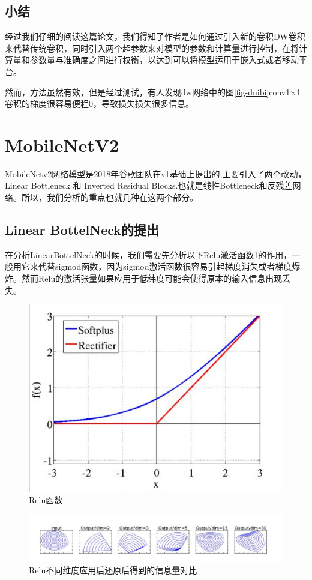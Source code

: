 \documentclass[UTF8,a4paper,12pt]{ctexart}
\begin{document}
 
 
\subsection{小结}
经过我们仔细的阅读这篇论文，我们得知了作者是如何通过引入新的卷积DW卷积来代替传统卷积，同时引入两个超参数来对模型的参数和计算量进行控制，在将计算量和参数量与准确度之间进行权衡，以达到可以将模型运用于嵌入式或者移动平台。

然而，方法虽然有效，但是经过测试，有人发现dw网络中的图\ref{fig-duibi}conv1$\times$1卷积的梯度很容易便程0，导致损失损失很多信息。
 
 
 
 
 
 
 
 
\section{MobileNetV2}\label{sec-v2}
MobileNetv2网络模型是2018年谷歌团队在v1基础上提出的\cite{MOBV2},主要引入了两个改动，Linear Bottleneck 和 Inverted Residual Blocks.也就是线性Bottleneck和反残差网络。所以，我们分析的重点也就几种在这两个部分。


\subsection{Linear BottelNeck的提出}

在分析LinearBottelNeck的时候，我们需要先分析以下Relu激活函数\ref{fig-relu}的作用，一般用它来代替sigmod函数，因为sigmod激活函数很容易引起梯度消失或者梯度爆炸。然而Relu的激活张量如果应用于低纬度可能会使得原本的输入信息出现丢失。
\begin{figure}[htbp]
	\centering
	\includegraphics[width=0.5\linewidth]{webmin/relu.jpg}
	\caption{Relu函数}
	\label{fig-relu}
\end{figure}


\begin{figure}[htbp]
	\centering
	\includegraphics[width=\linewidth]{webmin/relu维度信息.jpg}
	\caption{Relu不同维度应用后还原后得到的信息量对比}
	\label{fig-reluxinxi}
\end{figure}
\end{document}
